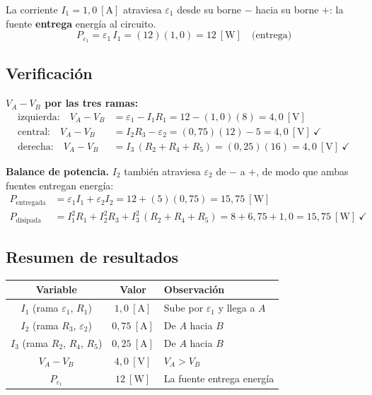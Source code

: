 \documentclass[12pt,letterpaper]{article}
\begin{document}
La corriente $I_1 = 1{,}0\ [\text{A}]$ atraviesa $\varepsilon_1$ desde su borne $-$ hacia su borne
$+$: la fuente \textbf{entrega} energ\'ia al circuito.
\[
    \boxed{P_{\varepsilon_1} = \varepsilon_1\, I_1 = (12)(1{,}0) = 12\ [\text{W}]\quad\text{(entrega)}}
\]

\subsection*{Verificaci\'on}

\textbf{$V_A - V_B$ por las tres ramas:}
\begin{align*}
    \text{izquierda:}\quad V_A - V_B &= \varepsilon_1 - I_1R_1 = 12 - (1{,}0)(8) = 4{,}0\ [\text{V}]\\[2pt]
    \text{central:}\quad   V_A - V_B &= I_2R_3 - \varepsilon_2 = (0{,}75)(12) - 5 = 4{,}0\ [\text{V}]\ \checkmark\\[2pt]
    \text{derecha:}\quad   V_A - V_B &= I_3\,(R_2+R_4+R_5) = (0{,}25)(16) = 4{,}0\ [\text{V}]\ \checkmark
\end{align*}

\textbf{Balance de potencia.} $I_2$ tambi\'en atraviesa $\varepsilon_2$ de $-$ a $+$, de modo que
ambas fuentes entregan energ\'ia:
\begin{align*}
    P_{\text{entregada}} &= \varepsilon_1 I_1 + \varepsilon_2 I_2 = 12 + (5)(0{,}75) = 15{,}75\ [\text{W}]\\[2pt]
    P_{\text{disipada}}  &= I_1^2R_1 + I_2^2R_3 + I_3^2\,(R_2+R_4+R_5)
                          = 8 + 6{,}75 + 1{,}0 = 15{,}75\ [\text{W}]\ \checkmark
\end{align*}

\subsection*{Resumen de resultados}

\begin{center}
\renewcommand{\arraystretch}{1.2}
\begin{tabular}{|c|c|l|}
\hline
\textbf{Variable} & \textbf{Valor} & \textbf{Observaci\'on} \\
\hline
$I_1$ (rama $\varepsilon_1$, $R_1$) & $1{,}0\ [\text{A}]$  & Sube por $\varepsilon_1$ y llega a $A$ \\
$I_2$ (rama $R_3$, $\varepsilon_2$) & $0{,}75\ [\text{A}]$ & De $A$ hacia $B$ \\
$I_3$ (rama $R_2$, $R_4$, $R_5$)    & $0{,}25\ [\text{A}]$ & De $A$ hacia $B$ \\
\hline
$V_A - V_B$         & $4{,}0\ [\text{V}]$ & $V_A > V_B$ \\
$P_{\varepsilon_1}$ & $12\ [\text{W}]$    & La fuente entrega energ\'ia \\
\hline
\end{tabular}
\end{center}
\end{document}
